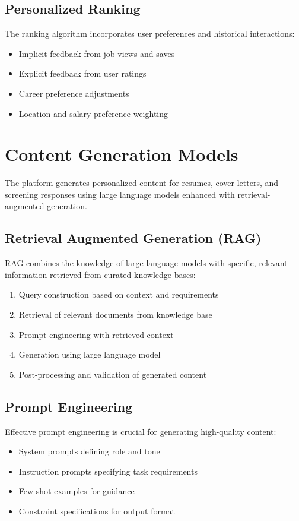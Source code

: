 \documentclass[12pt,a4paper]{report}
\begin{document}
\subsection{Personalized Ranking}
The ranking algorithm incorporates user preferences and historical interactions:
\begin{itemize}[leftmargin=2em]
  \item Implicit feedback from job views and saves
  \item Explicit feedback from user ratings
  \item Career preference adjustments
  \item Location and salary preference weighting
\end{itemize}

\section{Content Generation Models}
The platform generates personalized content for resumes, cover letters, and screening responses using large language models enhanced with retrieval-augmented generation.

\subsection{Retrieval Augmented Generation (RAG)}
RAG combines the knowledge of large language models with specific, relevant information retrieved from curated knowledge bases:
\begin{enumerate}[leftmargin=2em]
  \item Query construction based on context and requirements
  \item Retrieval of relevant documents from knowledge base
  \item Prompt engineering with retrieved context
  \item Generation using large language model
  \item Post-processing and validation of generated content
\end{enumerate}

\subsection{Prompt Engineering}
Effective prompt engineering is crucial for generating high-quality content:
\begin{itemize}[leftmargin=2em]
  \item System prompts defining role and tone
  \item Instruction prompts specifying task requirements
  \item Few-shot examples for guidance
  \item Constraint specifications for output format
\end{itemize}
\end{document}
